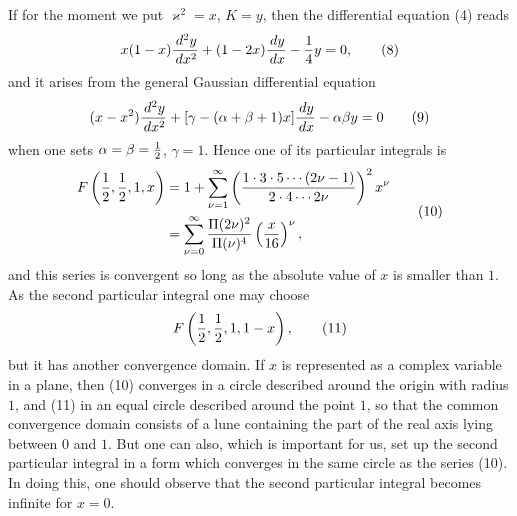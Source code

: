 \documentclass[11pt]{article}
\providecommand{\dd}{\,d}
\begin{document}
If for the moment we put $\varkappa^2=x$, $K=y$, then the differential equation (4) reads
\begin{equation}
x(1-x){\dd^2y\over\dd x^2}+(1-2x){\dd y\over\dd x}-{1\over4}y=0,
\tag{8}
\end{equation}
and it arises from the general Gaussian differential equation
\begin{equation}
(x-x^2){\dd^2y\over\dd x^2}+[\gamma-(\alpha+\beta+1)x]{\dd y\over\dd x}-\alpha\beta y=0
\tag{9}
\end{equation}
when one sets $\alpha=\beta={1\over2}$, $\gamma=1$. Hence one of its particular integrals is
\begin{equation}
\begin{aligned}
F\left({1\over2},{1\over2},1,x\right)
&=1+\sum_{\nu=1}^{\infty}\left({1\cdot3\cdot5\cdots(2\nu-1)\over2\cdot4\cdots2\nu}\right)^2x^\nu\\
&=\sum_{\nu=0}^{\infty}{\Pi(2\nu)^2\over\Pi(\nu)^4}\left({x\over16}\right)^\nu,
\end{aligned}
\tag{10}
\end{equation}
and this series is convergent so long as the absolute value of $x$ is smaller than $1$. As the second particular integral one may choose
\begin{equation}
F\left({1\over2},{1\over2},1,1-x\right),
\tag{11}
\end{equation}
but it has another convergence domain. If $x$ is represented as a complex variable in a plane, then (10) converges in a circle described around the origin with radius $1$, and (11) in an equal circle described around the point $1$, so that the common convergence domain consists of a lune containing the part of the real axis lying between $0$ and $1$. But one can also, which is important for us, set up the second particular integral in a form which converges in the same circle as the series (10). In doing this, one should observe that the second particular integral becomes infinite for $x=0$.
\end{document}
